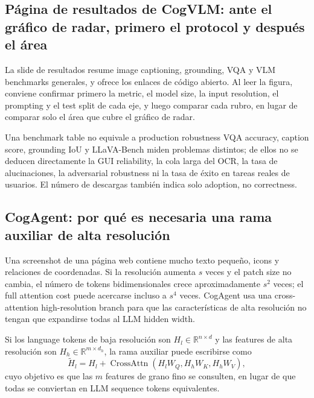 \subsection{Página de resultados de CogVLM: ante el gráfico de radar, primero el protocol y después el área}

La slide de resultados resume image captioning, grounding, VQA y VLM benchmarks generales, y ofrece los enlaces de código abierto. Al leer la figura, conviene confirmar primero la metric, el model size, la input resolution, el prompting y el test split de cada eje, y luego comparar cada rubro, en lugar de comparar solo el área que cubre el gráfico de radar.


\begin{warningbox}{Una benchmark table no equivale a production robustness}
VQA accuracy, caption score, grounding IoU y LLaVA-Bench miden problemas distintos; de ellos no se deducen directamente la GUI reliability, la cola larga del OCR, la tasa de alucinaciones, la adversarial robustness ni la tasa de éxito en tareas reales de usuarios. El número de descargas también indica solo adoption, no correctness.
\end{warningbox}

\subsection{CogAgent: por qué es necesaria una rama auxiliar de alta resolución}

Una screenshot de una página web contiene mucho texto pequeño, icons y relaciones de coordenadas. Si la resolución aumenta $s$ veces y el patch size no cambia, el número de tokens bidimensionales crece aproximadamente $s^2$ veces; el full attention cost puede acercarse incluso a $s^4$ veces. CogAgent usa una cross-attention high-resolution branch para que las características de alta resolución no tengan que expandirse todas al LLM hidden width.


Si los language tokens de baja resolución son $H_l\in\mathbb{R}^{n\times d}$ y las features de alta resolución son $H_h\in\mathbb{R}^{m\times d_h}$, la rama auxiliar puede escribirse como
\[
\widetilde H_l=H_l+\operatorname{CrossAttn}(H_lW_Q,H_hW_K,H_hW_V),
\]
cuyo objetivo es que las $m$ features de grano fino se consulten, en lugar de que todas se conviertan en LLM sequence tokens equivalentes.

